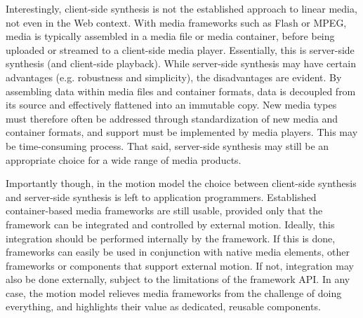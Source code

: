 Interestingly, client-side synthesis is not the established approach to linear
media, not even in the Web context. With media frameworks such as Flash or
MPEG, media is typically assembled in a media file or media container, before
being uploaded or streamed to a client-side media player. Essentially, this is
server-side synthesis (and client-side playback). While server-side synthesis
may have certain advantages (e.g. robustness and simplicity), the
disadvantages are evident. By assembling data within media files and container
formats, data is decoupled from its source and effectively flattened into an
immutable copy. New media types must therefore often be addressed through
standardization of new media and container formats, and support must be
implemented by media players. This may be time-consuming process. That
said, server-side synthesis may still be an appropriate choice for a wide
range of media products.

Importantly though, in the motion model the choice between client-side 
synthesis and server-side synthesis is left to application programmers.
Established container-based media frameworks are still usable, provided only
that the framework can be integrated and controlled by external motion.
Ideally, this integration should be performed internally by the framework. If
this is done, frameworks can easily be used in conjunction with native media
elements, other frameworks or components that support external motion. If not,
integration may also be done externally, subject to the limitations of the
framework API. In any case, the motion model relieves media
frameworks from the challenge of doing everything, and highlights their value
as dedicated, reusable components.
